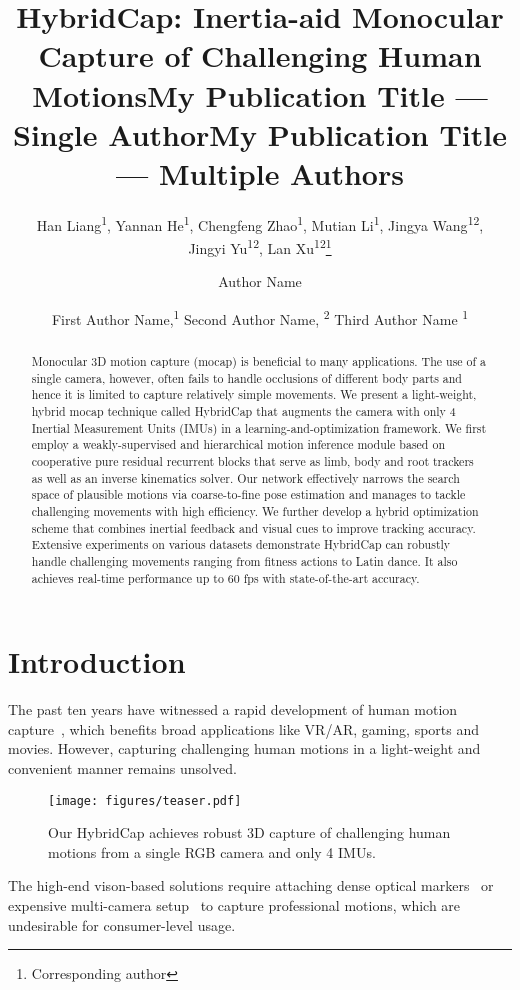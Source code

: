 \documentclass[letterpaper]{article} \usepackage{aaai23}  \usepackage{times}  \usepackage{helvet}  \usepackage{courier}  \usepackage[hyphens]{url}  \usepackage{graphicx} \urlstyle{rm} \def\UrlFont{\rm}  \usepackage{natbib}  \usepackage{caption} \frenchspacing  \setlength{\pdfpagewidth}{8.5in}  \setlength{\pdfpageheight}{11in}  \usepackage{algorithm}
\title{HybridCap: Inertia-aid Monocular Capture of Challenging Human Motions}
\author{
Han Liang\textsuperscript{\rm 1},
    Yannan He\textsuperscript{\rm 1},
    Chengfeng Zhao\textsuperscript{\rm 1},
    Mutian Li\textsuperscript{\rm 1},
    Jingya Wang\textsuperscript{\rm 1}\textsuperscript{\rm 2},\\
    Jingyi Yu\textsuperscript{\rm 1}\textsuperscript{\rm 2},
    Lan Xu\textsuperscript{\rm 1}\textsuperscript{\rm 2}\thanks{Corresponding author}
}
\title{My Publication Title --- Single Author}
\author {
    Author Name
}
\title{My Publication Title --- Multiple Authors}
\author {
First Author Name,\textsuperscript{\rm 1}
    Second Author Name, \textsuperscript{\rm 2}
    Third Author Name \textsuperscript{\rm 1}
}
\begin{document}
\maketitle

\begin{abstract}
Monocular 3D motion capture (mocap) is beneficial to many applications. The use of a single camera, however, often fails to handle occlusions of different body parts and hence it is limited to capture relatively simple movements. 
We present a light-weight, hybrid mocap technique called HybridCap that augments the camera with only 4 Inertial Measurement Units (IMUs) in a learning-and-optimization framework. 
We first employ a weakly-supervised and hierarchical motion inference module based on cooperative pure residual recurrent blocks that serve as limb, body and root trackers as well as an inverse kinematics solver. 
Our network effectively narrows the search space of plausible motions via coarse-to-fine pose estimation and manages to tackle challenging movements with high efficiency. 
We further develop a hybrid optimization scheme that combines inertial feedback and visual cues to improve tracking accuracy. 
Extensive experiments on various datasets demonstrate HybridCap can robustly handle challenging movements ranging from fitness actions to Latin dance.
It also achieves real-time performance up to 60 fps with state-of-the-art accuracy.
\end{abstract}


\section{Introduction}
The past ten years have witnessed a rapid development of human motion capture~\cite{Davison2001,hasler2009markerless,StollHGST2011,wang2017outdoor}, which benefits broad applications like VR/AR, gaming, sports and movies.
However, capturing challenging human motions in a light-weight and convenient manner remains unsolved.

\begin{figure}[tbp] 
	\centering  
	\texttt{[image: figures/teaser.pdf]} 
	\caption{Our HybridCap achieves robust 3D capture of challenging human motions from a single RGB camera and only 4 IMUs.} 
	\label{fig:fig_1_teaser} 
	\vspace{-9pt} 
\end{figure} 


The high-end vison-based solutions require attaching dense optical markers~\cite{VICON} or expensive multi-camera setup~\cite{StollHGST2011,joo2015panoptic,collet2015high,TotalCapture} to capture professional motions, which are undesirable for consumer-level usage.
\end{document}
